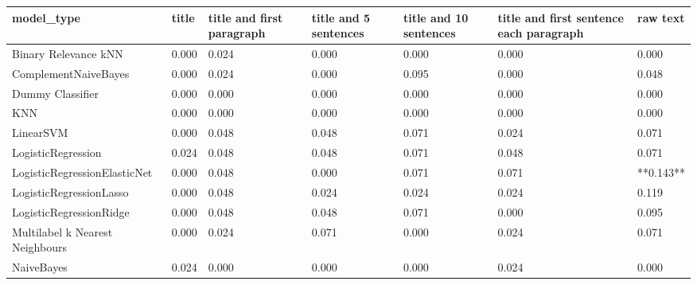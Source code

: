 \begin{tabular}{lllllll}
\toprule
                     model\_type & title & title and first paragraph & title and 5 sentences & title and 10 sentences & title and first sentence each paragraph &  raw text \\
\midrule
           Binary Relevance kNN & 0.000 &                     0.024 &                 0.000 &                  0.000 &                                   0.000 &     0.000 \\
           ComplementNaiveBayes & 0.000 &                     0.024 &                 0.000 &                  0.095 &                                   0.000 &     0.048 \\
               Dummy Classifier & 0.000 &                     0.000 &                 0.000 &                  0.000 &                                   0.000 &     0.000 \\
                            KNN & 0.000 &                     0.000 &                 0.000 &                  0.000 &                                   0.000 &     0.000 \\
                      LinearSVM & 0.000 &                     0.048 &                 0.048 &                  0.071 &                                   0.024 &     0.071 \\
             LogisticRegression & 0.024 &                     0.048 &                 0.048 &                  0.071 &                                   0.048 &     0.071 \\
   LogisticRegressionElasticNet & 0.000 &                     0.048 &                 0.000 &                  0.071 &                                   0.071 & **0.143** \\
        LogisticRegressionLasso & 0.000 &                     0.048 &                 0.024 &                  0.024 &                                   0.024 &     0.119 \\
        LogisticRegressionRidge & 0.000 &                     0.048 &                 0.048 &                  0.071 &                                   0.000 &     0.095 \\
Multilabel k Nearest Neighbours & 0.000 &                     0.024 &                 0.071 &                  0.000 &                                   0.024 &     0.071 \\
                     NaiveBayes & 0.024 &                     0.000 &                 0.000 &                  0.000 &                                   0.024 &     0.000 \\

\end{tabular}
